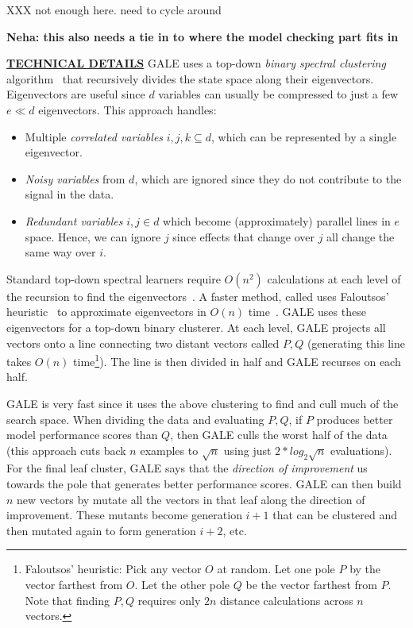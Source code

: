 \documentclass[12pt]{article}
\newcommand{\bi}{\begin{itemize}[leftmargin=0.7cm]}
\newcommand{\ei}{\end{itemize}}
\begin{document}
 XXX not enough here. need to cycle around
 
 \textbf{Neha: this also needs a tie in to where the model checking part fits in}
 
\noindent
\underline{{\bf TECHNICAL DETAILS}} 
GALE uses  a top-down  {\em binary spectral clustering} algorithm~\cite{kamvar03} 
that recursively divides
the state space along their eigenvectors. Eigenvectors are useful since 
  $d$ variables can usually be compressed to just
  a few $e \ll d$ eigenvectors. This approach handles:
\bi
\item
Multiple {\em correlated variables} $i,j,k \subseteq d$, which can be represented
by a single  eigenvector.
\item
{\em Noisy variables} from $d$, which are 
ignored since they  do not contribute to the signal in the data.
\item
{\em Redundant  variables} \mbox{$i,j \in d$} which become (approximately) parallel lines
in $e$ space. Hence, we 
can ignore $j$ 
since effects that change over $j$ all
change   the same way over $i$.
\ei
Standard top-down spectral learners require  $O(n^2)$ calculations at each level 
of the recursion to find the eigenvectors~\cite{boley98}. A faster method, called  
uses Faloutsos'  heuristic~\cite{Faloutsos1995} to
approximate eigenvectors   in $O(n)$ time~\cite{platt05}.
GALE uses these eigenvectors for a top-down binary clusterer.  
At each level, GALE  projects all  vectors onto a line connecting two distant vectors called $P,Q$ (generating this line takes $O(n)$ time\footnote{Faloutsos’ heuristic: Pick any vector $O$ at random. Let one pole $P$ by the
vector farthest from $O$. Let the other pole $Q$ be the vector farthest from $P$. Note that
finding $P,Q$ requires only $2n$ distance calculations across $n$ vectors.}).
The line is then divided in half
and GALE recurses on each half. 

GALE is very fast since it uses the above clustering to find and cull much of the 
search space.
When dividing the data and 
evaluating   $P,Q$, if $P$ produces better model performance scores than $Q$, then
GALE  culls   the worst half of the data (this approach cuts back $n$ examples to $\sqrt{n}$ using
just $2*log_2{\sqrt{n}}$ evaluations). 
For the final leaf cluster, GALE says that the {\em direction of improvement} us
towards the pole
that generates better performance scores. GALE can then build $n$ new vectors by mutate
all the vectors in that leaf along the direction of improvement. 
These mutants become
generation $i+1$ that can be clustered  and then mutated again to form
generation $i+2$, etc.
\end{document}
